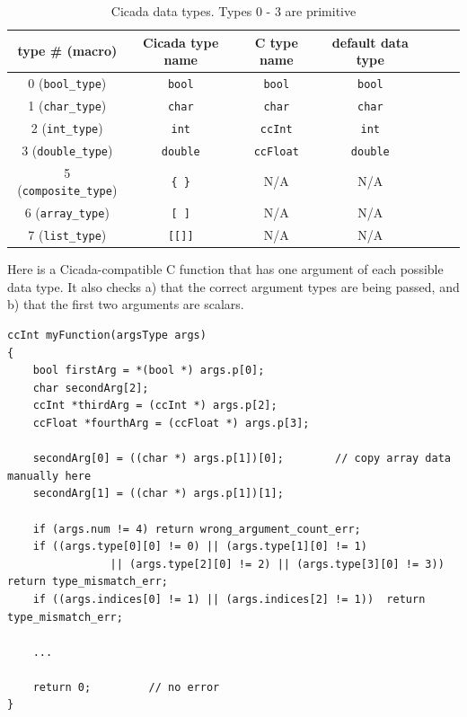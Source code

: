 \documentclass{article}
\newenvironment{code}{
       \begin{list}{}{
               \setlength{\leftmargin}{.4in}
               \setlength{\rightmargin}{0in}
               \setlength{\topsep}{.2in}
       }
       \small
       \item[] }
       { \end{list}   }
\begin{document}
\begin{table}
\begin{center}
\begin{tabular}{|c|c|c|c|c|c|c|}
\hline
type \# (macro) & Cicada type name & C type name & default data type\\
\hline
0 (\verb#bool_type#) & \verb#bool# & \verb#bool# & \verb#bool#\index{bool@\texttt{bool}}\\
1 (\verb#char_type#) & \verb#char# & \verb#char# & \verb#char#\index{char@\texttt{char}}\\
2 (\verb#int_type#) & \verb#int# & \verb#ccInt# & \verb#int#\index{int@\texttt{int}}\\
3 (\verb#double_type#) & \verb#double# & \verb#ccFloat# & \verb#double#\index{double@\texttt{double}}\\
\hline
5 (\verb#composite_type#) & \verb#{ }# & N/A & N/A\\
6 (\verb#array_type#) & \verb#[ ]# & N/A & N/A\\
7 (\verb#list_type#) & \verb#[[]]# & N/A & N/A\\
\hline
\end{tabular}
\caption{Cicada data types.  Types 0 - 3 are primitive} 
\label{types_table}
\end{center}
\end{table}

Here is a Cicada-compatible C function that has one argument of each possible data type.  It also checks a) that the correct argument types are being passed, and b) that the first two arguments are scalars.

\begin{code} \begin{verbatim}
ccInt myFunction(argsType args)
{
    bool firstArg = *(bool *) args.p[0];
    char secondArg[2];
    ccInt *thirdArg = (ccInt *) args.p[2];
    ccFloat *fourthArg = (ccFloat *) args.p[3];
    
    secondArg[0] = ((char *) args.p[1])[0];        // copy array data manually here
    secondArg[1] = ((char *) args.p[1])[1];
    
    if (args.num != 4) return wrong_argument_count_err;
    if ((args.type[0][0] != 0) || (args.type[1][0] != 1)
                || (args.type[2][0] != 2) || (args.type[3][0] != 3))  return type_mismatch_err;
    if ((args.indices[0] != 1) || (args.indices[2] != 1))  return type_mismatch_err;
    
    ...
    
    return 0;         // no error
}
\end{verbatim} \end{code}
\end{document}
